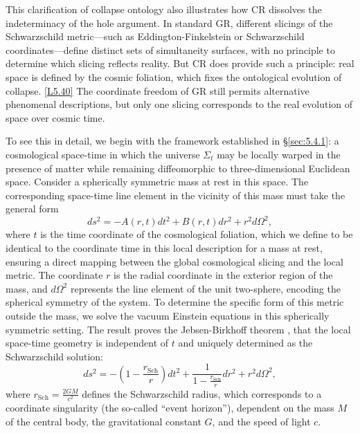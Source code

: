\documentclass[12pt]{book}
\newcounter{logicanchor}
\newenvironment{logicanchorenv}[1]{\refstepcounter{logicanchor}\label{#1}}{}
\newcommand{\logiclink}[2]{\begin{logicanchorenv}{logic:#1}\end{logicanchorenv}\hyperref[appendix:#1]{[#1]}\xspace}
\begin{document}
This clarification of collapse ontology also illustrates how CR dissolves the indeterminacy of the hole argument. In standard GR, different slicings of the Schwarzschild metric---such as Eddington-Finkelstein or Schwarzschild coordinates---define distinct sets of simultaneity surfaces, with no principle to determine which slicing reflects reality. But CR does provide such a principle: real space is defined by the cosmic foliation, which fixes the ontological evolution of collapse. \logiclink{L5.40}{} The coordinate freedom of GR still permits alternative phenomenal descriptions, but only one slicing corresponds to the real evolution of space over cosmic time.

To see this in detail, we begin with the framework established in \S\ref{sec:5.4.1}: a cosmological space-time in which the universe $\Sigma_t$ may be locally warped in the presence of matter while remaining diffeomorphic to three-dimensional Euclidean space. Consider a spherically symmetric mass at rest in this space. The corresponding space-time line element in the vicinity of this mass must take the general form
\begin{equation} 
    ds^2=-A(r,t)dt^2+B(r,t)dr^2+r^2d\Omega^2, 
    \label{eq:JB1} 
\end{equation}
where $t$ is the time coordinate of the cosmological foliation, which we define to be identical to the coordinate time in this local description for a mass at rest, ensuring a direct mapping between the global cosmological slicing and the local metric. The coordinate $r$ is the radial coordinate in the exterior region of the mass, and $d\Omega^2$ represents the line element of the unit two-sphere, encoding the spherical symmetry of the system. To determine the specific form of this metric outside the mass, we solve the vacuum Einstein equations in this spherically symmetric setting. The result proves the Jebsen-Birkhoff theorem \citep{Jebsen1921,Jebsen2005,Birkhoff1923}, that the local space-time geometry is independent of $t$ and uniquely determined as the Schwarzschild solution:
\begin{equation} 
    ds^2=-\left(1-\frac{r_{\mathrm{Sch}}}{r}\right)dt^2+\frac{1}{1-\frac{r_{\mathrm{Sch}}}{r}}dr^2+r^2d\Omega^2, 
    \label{eq:Sch} 
\end{equation}
where $r_{\mathrm{Sch}} = \frac{2GM}{c^2}$ defines the Schwarzschild radius, which corresponds to a coordinate singularity (the so-called ``event horizon''), dependent on the mass $M$ of the central body, the gravitational constant $G$, and the speed of light $c$.
\end{document}
